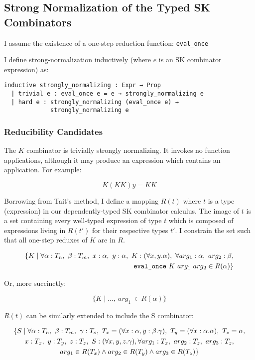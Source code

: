 \documentclass[11pt]{article}
\begin{document}
\subsection{Strong Normalization of the Typed SK Combinators}
\label{sec:orgb9cdc07}

I assume the existence of a one-step reduction function: \texttt{eval\_once}

I define strong-normalization inductively (where \(e\) is an SK combinator expression) as:

\begin{verbatim}
inductive strongly_normalizing : Expr → Prop
  | trivial e : eval_once e = e → strongly_normalizing e
  | hard e : strongly_normalizing (eval_once e) →
             strongly_normalizing e
\end{verbatim}
\subsubsection{Reducibility Candidates}
\label{sec:org8c9c379}

The \(K\) combinator is trivially strongly normalizing. It invokes no function applications, although it may produce an expression which contains an application. For example:

\[
K (KK) y = KK
\]

Borrowing from Tait's method, I define a mapping \(R(t)\) where \(t\) is a type (expression) in our dependently-typed SK combinator calculus. The image of \(t\) is a set containing every well-typed expression of type \(t\) which is composed of expressions living in \(R(t')\) for their respective types \(t'\). I constrain the set such that all one-step reduxes of \(K\) are in \(R\).

\begin{align}
\{ K \mid \forall \alpha : T_{n},\ \beta : T_{m},\ x : \alpha,\ y : \alpha,\ K : (\forall x, y.\alpha),\ \forall arg_{1} : \alpha,\ arg_{2} : \beta, \notag \\
\text{\texttt{eval\_once}}\ K\  arg_{1}\  arg_{2} \in R(\alpha) \}
\end{align}

Or, more succinctly:

\[
\{ K \mid ...,\ arg_{1}\ \in R(\alpha) \}
\]

\(R(t)\) can be similarly extended to include the S combinator:

\begin{gather*}
\{ S \mid \forall \alpha : T_{n},\ \beta : T_{m},\ \gamma : T_{o},\ T_{x} = (\forall x : \alpha, y : \beta.\gamma),\ T_{y} = (\forall x : \alpha.\alpha),\ T_{z} = \alpha, \notag \\
  x : T_{x},\ y : T_{y},\ z : T_{z},\ S : (\forall x, y, z.\gamma), \forall arg_{1} : T_{x},\ arg_{2} : T_{z},\ arg_{3} : T_{z}, \notag \\
  arg_{1} \in R(T_{x}) \land arg_{2} \in R(T_{y}) \land arg_{3} \in R(T_{z}) \}
\end{gather*}
\end{document}
